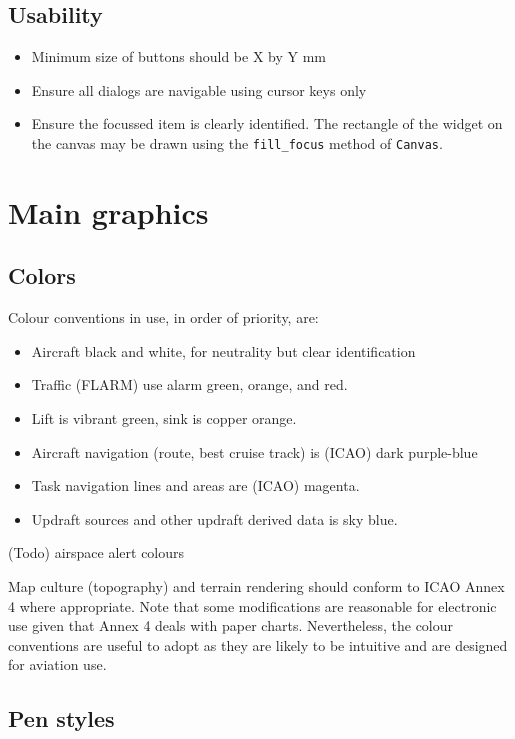 \documentclass[a4paper,12pt]{refrep}
\begin{document}
\subsection{Usability}
\begin{itemize}
\item Minimum size of buttons should be X by Y mm
\item Ensure all dialogs are navigable using cursor keys only
\item Ensure the focussed item is clearly identified.  The rectangle
  of the widget on the canvas may be drawn using the \verb|fill_focus| method
  of \verb|Canvas|.
\end{itemize}

\section{Main graphics}

\subsection{Colors}
Colour conventions in use, in order of priority, are:
\begin{itemize}
\item Aircraft black and white, for neutrality but clear identification
\item Traffic (FLARM) use alarm green, orange, and red.
\item Lift is vibrant green, sink is copper orange.
\item Aircraft navigation (route, best cruise track) is (ICAO) dark purple-blue
\item Task navigation lines and areas are (ICAO) magenta.
\item Updraft sources and other updraft derived data is sky blue.
\end{itemize}

(Todo) airspace alert colours

Map culture (topography) and terrain rendering should conform to ICAO
Annex 4 where appropriate.  Note that some modifications are
reasonable for electronic use given that Annex 4 deals with paper
charts.  Nevertheless, the colour conventions are useful to adopt as they are
likely to be intuitive and are designed for aviation use.

\subsection{Pen styles}
\end{document}
